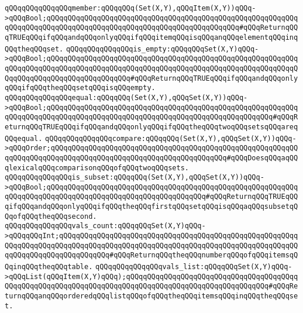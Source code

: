 \verb|qQQqqQQqqQQqqQQqmember:qQQqqQQq(Set(X,Y),qQQqItem(X,Y))qQQq->qQQqBool;qQQqqQQqqQQqqQQqqQQqqQQqqQQqqQQqqQQqqQQqqQQqqQQqqQQqqQQqqQQqqQQqqQQqqQQqqQQqqQQqqQQqqQQqqQQqqQQqqQQqqQQqqQQqqQQqqQQq#qQQqReturnqQQqTRUEqQQqifqQQqandqQQqonlyqQQqifqQQqitemqQQqisqQQqanqQQqelementqQQqinqQQqtheqQQqset.|\newline
\newline
\verb|qQQqqQQqqQQqqQQqis_empty:qQQqqQQqSet(X,Y)qQQq->qQQqBool;qQQqqQQqqQQqqQQqqQQqqQQqqQQqqQQqqQQqqQQqqQQqqQQqqQQqqQQqqQQqqQQqqQQqqQQqqQQqqQQqqQQqqQQqqQQqqQQqqQQqqQQqqQQqqQQqqQQqqQQqqQQqqQQqqQQqqQQqqQQqqQQqqQQqqQQqqQQqqQQq#qQQqReturnqQQqTRUEqQQqifqQQqandqQQqonlyqQQqifqQQqtheqQQqsetqQQqisqQQqempty.|\newline
\newline
\verb|qQQqqQQqqQQqqQQqequal:qQQqqQQq(Set(X,Y),qQQqSet(X,Y))qQQq->qQQqBool;qQQqqQQqqQQqqQQqqQQqqQQqqQQqqQQqqQQqqQQqqQQqqQQqqQQqqQQqqQQqqQQqqQQqqQQqqQQqqQQqqQQqqQQqqQQqqQQqqQQqqQQqqQQqqQQqqQQqqQQqqQQq#qQQqReturnqQQqTRUEqQQqifqQQqandqQQqonlyqQQqifqQQqtheqQQqtwoqQQqsetsqQQqareqQQqequal.|\newline
\newline
\verb|qQQqqQQqqQQqqQQqcompare:qQQqqQQq(Set(X,Y),qQQqSet(X,Y))qQQq->qQQqOrder;qQQqqQQqqQQqqQQqqQQqqQQqqQQqqQQqqQQqqQQqqQQqqQQqqQQqqQQqqQQqqQQqqQQqqQQqqQQqqQQqqQQqqQQqqQQqqQQqqQQqqQQqqQQqqQQq#qQQqDoesqQQqaqQQqlexicalqQQqcomparisonqQQqofqQQqtwoqQQqsets.|\newline
\newline
\verb|qQQqqQQqqQQqqQQqis_subset:qQQqqQQq(Set(X,Y),qQQqSet(X,Y))qQQq->qQQqBool;qQQqqQQqqQQqqQQqqQQqqQQqqQQqqQQqqQQqqQQqqQQqqQQqqQQqqQQqqQQqqQQqqQQqqQQqqQQqqQQqqQQqqQQqqQQqqQQqqQQqqQQqqQQq#qQQqReturnqQQqTRUEqQQqifqQQqandqQQqonlyqQQqifqQQqtheqQQqfirstqQQqsetqQQqisqQQqaqQQqsubsetqQQqofqQQqtheqQQqsecond.|\newline
\newline
\verb|qQQqqQQqqQQqqQQqvals_count:qQQqqQQqSet(X,Y)qQQq->qQQqqQQqInt;qQQqqQQqqQQqqQQqqQQqqQQqqQQqqQQqqQQqqQQqqQQqqQQqqQQqqQQqqQQqqQQqqQQqqQQqqQQqqQQqqQQqqQQqqQQqqQQqqQQqqQQqqQQqqQQqqQQqqQQqqQQqqQQqqQQqqQQqqQQqqQQqqQQqqQQq#qQQqReturnqQQqtheqQQqnumberqQQqofqQQqitemsqQQqinqQQqtheqQQqtable.|\newline
\newline
\verb|qQQqqQQqqQQqqQQqvals_list:qQQqqQQqSet(X,Y)qQQq->qQQqList(qQQqItem(X,Y)qQQq);qQQqqQQqqQQqqQQqqQQqqQQqqQQqqQQqqQQqqQQqqQQqqQQqqQQqqQQqqQQqqQQqqQQqqQQqqQQqqQQqqQQqqQQqqQQqqQQqqQQqqQQq#qQQqReturnqQQqanqQQqorderedqQQqlistqQQqofqQQqtheqQQqitemsqQQqinqQQqtheqQQqset.|\newline

